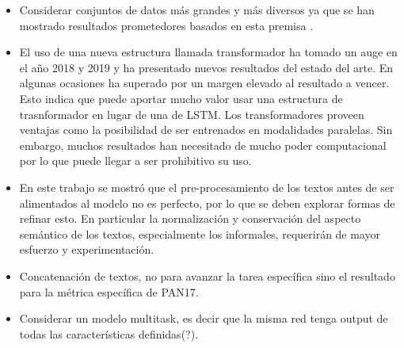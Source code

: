 \begin{itemize}

\item Considerar conjuntos de datos más grandes y más diversos ya que se han mostrado resultados prometedores basados en esta premisa \parencite{radford2019language}.

\item El uso de una nueva estructura llamada transformador ha tomado un auge en el año 2018 y 2019 y ha presentado nuevos resultados del estado del arte. En algunas ocasiones ha superado por un margen elevado al resultado a vencer. Esto indica que puede aportar mucho valor usar una estructura de trasnformador en lugar de una de LSTM. Los transformadores proveen ventajas como la posibilidad de ser entrenados en modalidades paralelas. Sin embargo, muchos resultados han necesitado de mucho poder computacional por lo que puede llegar a ser prohibitivo su uso.

\item En este trabajo se mostró que el pre-procesamiento de los textos antes de ser alimentados al modelo no es perfecto, por lo que se deben explorar formas de refinar esto. En particular la normalización y conservación del aspecto semántico de los textos, especialmente los informales, requerirán de mayor esfuerzo y experimentación.

\item Concatenación de textos, no para avanzar la tarea específica sino el resultado para la métrica específica de PAN17.

\item Considerar un modelo multitask, es decir que la misma red tenga output de todas las características definidas(?).


\end{itemize}

